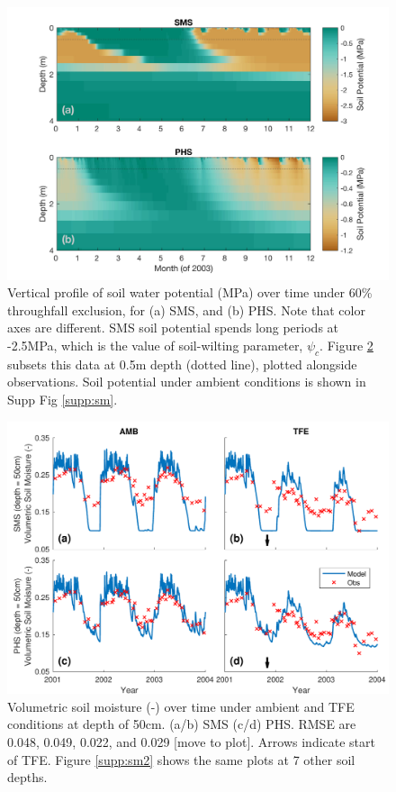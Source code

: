\documentclass[draft,linenumbers]{agujournal}
\begin{document}
  
      \clearpage
    \begin{figure}[h]
     \centering
     \includegraphics[width=30pc]{../figs3/smp.jpg}
     \caption{Vertical profile of soil water potential (MPa) over time under 60\% throughfall exclusion, for
     (a) SMS, and 
     (b) PHS.
     Note that color axes are different.
     SMS soil potential spends long periods at -2.5MPa, which is the value of soil-wilting parameter, $\psi_c$.
     Figure \ref{fig:sm2} subsets this data at 0.5m depth (dotted line), plotted alongside observations.
     Soil potential under ambient conditions is shown in Supp Fig \ref{supp:sm}.
 }
     \label{fig:sm}
  \end{figure}
  
        \clearpage
    \begin{figure}[h]
     \centering
     \includegraphics[width=30pc]{../figs3/sm2.pdf}
     \caption{Volumetric soil moisture (-) over time under ambient and TFE conditions at depth of 50cm.
     (a/b) SMS
     (c/d) PHS.
     RMSE are 0.048, 0.049, 0.022, and 0.029 [move to plot].
     Arrows indicate start of TFE. Figure \ref{supp:sm2} shows the same plots at 7 other soil depths. }
     \label{fig:sm2}
  \end{figure}
\end{document}
